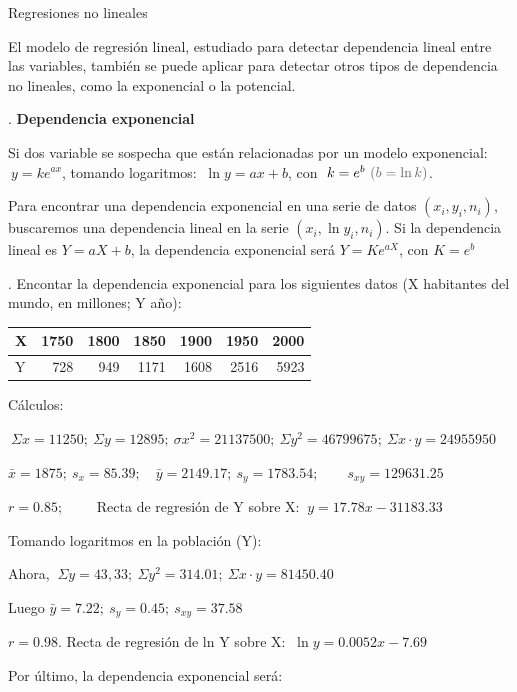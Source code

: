 \begin{myalertblock}{Regresiones no lineales}


El modelo de regresión lineal, estudiado para detectar dependencia lineal entre las variables, también se puede aplicar para detectar otros tipos de dependencia no lineales, como la exponencial o la potencial.

\begin{theorem}
.	\textbf{Dependencia exponencial}

Si dos variable se sospecha que están relacionadas por un modelo exponencial: $\ y=ke^{ax}$, tomando logaritmos: $\ \ln y=ax+b$, con $\ k=e^b\ \textcolor{gris}{(b=\ln k)}$.

Para encontrar una dependencia exponencial en una serie de datos $(x_i, y_i, n_i)$, buscaremos una dependencia lineal en la serie $(x_i, \ln y_i, n_i)$. Si la dependencia lineal es $Y=aX+b$, la dependencia exponencial será $Y=Ke^{aX}$, con $K=e^b$
\end{theorem}

\begin{example}
. Encontar la dependencia exponencial para los siguientes datos (X habitantes del mundo, en millones; Y año):

\begin{table}[H]
\centering
\begin{tabular}{l|rrrrrr}
X & 1750 & 1800 & 1850 & 1900 & 1950 & 2000 \\ \hline
Y & 728 & 949 & 1171 & 1608 & 2516 & 5923
\end{tabular}
\end{table}

Cálculos: 

$\ \Sigma x=11250;\ \Sigma y=12895;\ \sigma x^2=21137500;\ \Sigma y^2=46799675;\ \Sigma x\cdot y=24955950$

$\bar x=1875;\ s_x=85.39;\quad \bar y=2149.17;\ s_y=1783.54; \qquad s_{xy}=129631.25$

$r=0.85;\qquad $ Recta de regresión de Y sobre X: $\ y=17.78x-31183.33$

\vspace{4mm} Tomando logaritmos en la población (Y):

Ahora, $\ \Sigma y=43,33;\ \Sigma y^2= 314.01;\ \Sigma x\cdot y=81450.40$

Luego $\bar y=7.22;\ s_y=0.45; \ s_{xy}=37.58$

$r=0.98$. Recta de regresión de ln Y sobre X: $\ \ln y=0.0052x-7.69$

\vspace{4mm} Por último, la dependencia exponencial será: 


\end{example}
\end{myalertblock}

